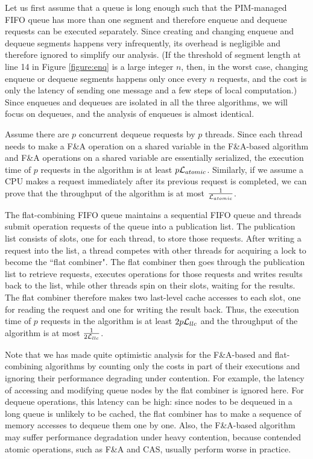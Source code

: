 Let us first assume that a queue is long enough such that the PIM-managed FIFO queue 
has more than one segment and therefore enqueue and dequeue requests can be executed separately. 
Since creating and changing enqueue and dequeue segments happens very infrequently, 
its overhead is negligible and therefore ignored to simplify our analysis.
(If the threshold of segment length at line 14 in Figure \ref{figure:enq} is a large integer $n$, 
then, in the worst case, changing enqueue or dequeue segments happens only once every $n$ requests, 
and the cost is only the latency of sending one message and a few steps of local computation.)
Since enqueues and dequeues are isolated in all the three algorithms, we will focus on dequeues, 
and the analysis of enqueues is almost identical. 

Assume there are $p$ concurrent dequeue requests by $p$ threads. 
Since each thread needs to make a F\&A operation on a shared variable in the F\&A-based algorithm and 
F\&A operations on a shared variable are essentially serialized, 
the execution time of $p$ requests in the algorithm is at least $p\mathcal{L}_{atomic}$. 
Similarly, if we assume a CPU makes a request immediately after its previous request is completed, 
we can prove that the throughput of the algorithm is at most ${1 \over \mathcal{L}_{atomic}}$.

The flat-combining FIFO queue maintains a sequential FIFO queue and threads submit operation requests 
of the queue into a publication list. 
The publication list consists of slots, one for each thread, to store those requests.
After writing a request into the list, a thread competes with other threads for acquiring a lock 
to become the ``flat combiner". 
The flat combiner then goes through the publication list to retrieve requests, executes operations for 
those requests and writes results back to the list, while other threads spin on their slots, 
waiting for the results. 
The flat combiner therefore makes two last-level cache accesses to each slot, 
one for reading the request and one for writing the result back. 
Thus, the execution time of $p$ requests in the algorithm is at least $2p\mathcal{L}_{llc}$ and 
the throughput of the algorithm is at most ${1 \over 2\mathcal{L}_{llc}}$.

Note that we has made quite optimistic analysis for the F\&A-based and flat-combining algorithms by counting  only the costs in part of their executions and ignoring their performance degrading under contention. 
For example, the latency of accessing and modifying queue nodes by the flat combiner is ignored here. 
For dequeue operations, this latency can be high: since nodes to be dequeued in a long queue is unlikely 
to be cached, the flat combiner has to make a sequence of memory accesses to dequeue them one by one.  
Also, the F\&A-based algorithm may suffer performance degradation under heavy contention, 
because contended atomic operations, such as F\&A and CAS, usually perform worse in practice.

